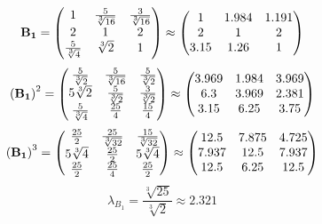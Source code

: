 \documentclass[10pt,a4paper]{article}
\begin{document}
	\[
		\bold{B_1} = 
		\begin{pmatrix}
			{1} {} & \frac{{5}} {\sqrt[3]{16}} & \frac{{3}} {\sqrt[3]{16}} \\
			{{2}} {} & {1} {} & {{2}} {} \\
			\frac{{5}} {\sqrt[3]{4}} & {\sqrt[3]{2}} {} & {1} {} \\
		\end{pmatrix}
		\approx
		\begin{pmatrix}
			1        & 1.984    & 1.191    \\
			2        & 1        & 2        \\
			3.15     & 1.26     & 1        \\
		\end{pmatrix}
	\]
	\[
		\left(\bold{B_1}\right)^{2} = 
		\begin{pmatrix}
			\frac{{5}} {\sqrt[3]{2}} & \frac{{5}} {\sqrt[3]{16}} & \frac{{5}} {\sqrt[3]{2}} \\
			{{5}\sqrt[3]{2}} {} & \frac{{5}} {\sqrt[3]{2}} & \frac{{3}} {\sqrt[3]{2}} \\
			\frac{{5}} {\sqrt[3]{4}} & \frac{{25}} {{4}} & \frac{{15}} {{4}} \\
		\end{pmatrix}
		\approx
		\begin{pmatrix}
			3.969    & 1.984    & 3.969    \\
			6.3      & 3.969    & 2.381    \\
			3.15     & 6.25     & 3.75     \\
		\end{pmatrix}
	\]
	\[
		\left(\bold{B_1}\right)^{3} = 
		\begin{pmatrix}
			\frac{{25}} {{2}} & \frac{{25}} {\sqrt[3]{32}} & \frac{{15}} {\sqrt[3]{32}} \\
			{{5}\sqrt[3]{4}} {} & \frac{{25}} {{2}} & {{5}\sqrt[3]{4}} {} \\
			\frac{{25}} {{2}} & \frac{{25}} {{4}} & \frac{{25}} {{2}} \\
		\end{pmatrix}
		\approx
		\begin{pmatrix}
			12.5     & 7.875    & 4.725    \\
			7.937    & 12.5     & 7.937    \\
			12.5     & 6.25     & 12.5     \\
		\end{pmatrix}
	\]
	\[
		\lambda_{B_1} = \frac{\sqrt[3]{25}} {\sqrt[3]{2}}\approx 2.321
	\]
\end{document}
